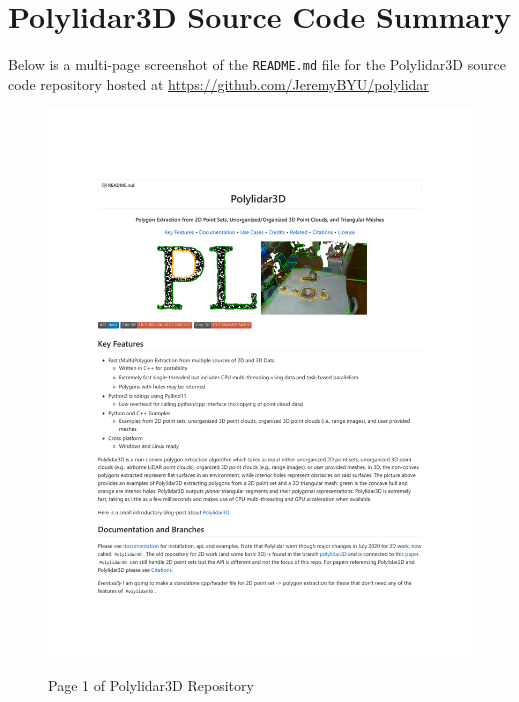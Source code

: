 
\section{Polylidar3D Source Code Summary} 
Below is a multi-page screenshot of the \texttt{README.md} file for the Polylidar3D source code repository hosted at \url{https://github.com/JeremyBYU/polylidar}

\begin{figure}[h!]
    \centering\includegraphics[page=1, trim=1.2in 1.2in 1.2in 1.2in, width=.82\linewidth]{appendix_1/imgs/Polylidar3DReadme.pdf}
    \label{fig:apx1_pl1}
    \caption{Page 1 of Polylidar3D Repository} 
\end{figure}

